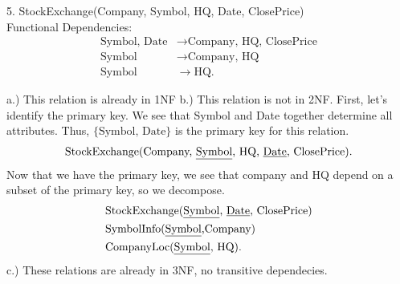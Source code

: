 \documentclass{report}
\begin{document}
   \pagebreak 
   \begin{mdframed}
       5. StockExchange(Company, Symbol, HQ, Date, ClosePrice) \\
        Functional Dependencies:
        \begin{align*}
            \text{Symbol, Date} &\to \text{Company, HQ, ClosePrice} \\
            \text{Symbol} &\to \text{Company, HQ} \\
            \text{Symbol} &\to \text{HQ}
        .\end{align*}
   \end{mdframed}
   \bigbreak \noindent 
   a.) This relation is already in 1NF
   \bigbreak \noindent 
   b.) This relation is not in 2NF. First, let's identify the primary key. We see that Symbol and Date together determine all attributes. Thus, $\{\text{Symbol, Date}\} $ is the primary key for this relation.
   \begin{align*}
       \text{StockExchange(Company, \underline{Symbol}, HQ, \underline{Date}, ClosePrice)}
   .\end{align*}
   \bigbreak \noindent 
   Now that we have the primary key, we see that company and HQ depend on a subset of the primary key, so we decompose.
   \begin{align*}
       &\text{StockExchange(\underline{Symbol}, \underline{Date}, ClosePrice)} \\
       &\text{SymbolInfo(\underline{Symbol},Company)} \\
       &\text{CompanyLoc(\underline{Symbol}, HQ)}
   .\end{align*}
   \bigbreak \noindent 
   c.) These relations are already in 3NF, no transitive dependecies. 

    





    
\end{document}
